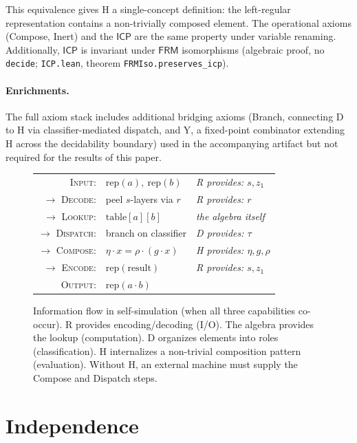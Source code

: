 \documentclass[a4paper,UKenglish,cleveref,autoref,thm-restate]{lipics-v2021}
\newcommand{\dotop}{\cdot}
\newcommand{\FRM}{\textsf{FRM}}
\newcommand{\ICP}{\textsf{ICP}}
\begin{document}
This equivalence gives H a single-concept definition: the left-regular representation contains a non-trivially composed element. The operational axioms (Compose, Inert) and the $\ICP$ are the same property under variable renaming. Additionally, $\ICP$ is invariant under $\FRM$ isomorphisms (algebraic proof, no \texttt{decide}; \texttt{ICP.lean}, theorem \texttt{FRMIso.preserves\_icp}).

\paragraph{Enrichments.}
The full axiom stack includes additional bridging axioms (Branch, connecting D to H via classifier-mediated dispatch, and Y, a fixed-point combinator extending H across the decidability boundary) used in the accompanying artifact but not required for the results of this paper.

\begin{figure}[t]
\centering
\begin{tabular}{@{}r@{~}l@{\quad}l@{}}
\textsc{Input}: & $\text{rep}(a),\ \text{rep}(b)$ & \emph{R provides: $s, z_1$} \\
$\to$ \textsc{Decode}: & peel $s$-layers via $r$ & \emph{R provides: $r$} \\
$\to$ \textsc{Lookup}: & $\text{table}[a][b]$ & \emph{the algebra itself} \\
$\to$ \textsc{Dispatch}: & branch on classifier & \emph{D provides: $\tau$} \\
$\to$ \textsc{Compose}: & $\eta \dotop x = \rho \dotop (g \dotop x)$ & \emph{H provides: $\eta, g, \rho$} \\
$\to$ \textsc{Encode}: & $\text{rep}(\text{result})$ & \emph{R provides: $s, z_1$} \\
\textsc{Output}: & $\text{rep}(a \dotop b)$ & \\
\end{tabular}
\caption{Information flow in self-simulation (when all three capabilities co-occur). R provides encoding/decoding (I/O). The algebra provides the lookup (computation). D organizes elements into roles (classification). H internalizes a non-trivial composition pattern (evaluation). Without H, an external machine must supply the Compose and Dispatch steps.}
\label{fig:flow}
\end{figure}

\section{Independence}
\label{sec:independence}
\end{document}
